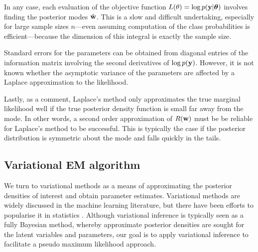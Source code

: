 In any case, each evaluation of the objective function $L(\theta) = \log p({\mathbf y}|{\bm\theta})$ involves finding the posterior modes $\hat{{\mathbf w}}$.
This is a slow and difficult undertaking, especially for large sample sizes $n$---even assuming computation of the class probabilities is efficient---because the dimension of this integral is exactly the sample size.

Standard errors for the parameters can be obtained from diagonal entries of the information matrix involving the second derivatives of $\log p({\mathbf y})$.
However, it is not known whether the asymptotic variance of the parameters are affected by a Laplace approximation to the likelihood.

Lastly, as a comment, Laplace's method only approximates the true marginal likelihood well if the true posterior density function is small far away from the mode.
In other words, a second order approximation of $R({\mathbf w})$ must be be reliable for Laplace's method to be successful.
This is typically the case if the posterior distribution is symmetric about the mode and falls quickly in the tails.


\subsection{Variational EM algorithm}

We turn to variational methods as a means of approximating the posterior densities of interest and obtain parameter estimates.
Variational methods are widely discussed in the machine learning literature, but there have been efforts to popularise it in statistics \citep{blei2017variational}.
Although variational inference is typically seen as a fully Bayesian method, whereby approximate posterior densities are sought for the latent variables and parameters, our goal is to apply variational inference to facilitate a pseudo maximum likelihood approach.

